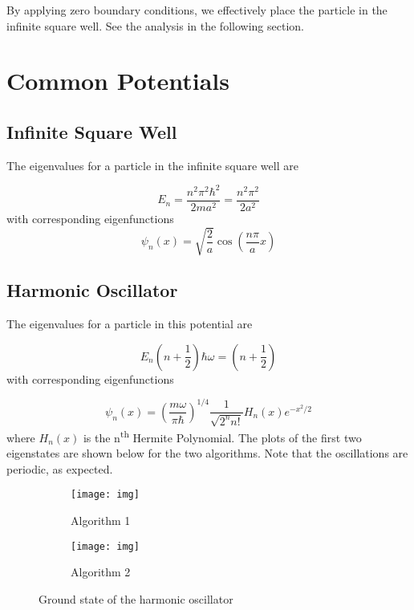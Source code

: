 \documentclass{article}
\begin{document}
By applying zero boundary conditions, we effectively place the particle in the infinite square well. See the analysis in the following section. 

\section{Common Potentials}

\subsection{Infinite Square Well}

The eigenvalues for a particle in the infinite square well are

\begin{equation}
E_n = \frac{n^2 \pi^2 \hbar^2}{2 ma^2} = \frac{n^2 \pi ^2}{2 a^2}
\end{equation}
%
with corresponding eigenfunctions
\begin{equation}
\psi_n(x) = \sqrt{\frac{2}{a}} \cos \left( \frac{n\pi}{a} x \right)
\end{equation}

\subsection{Harmonic Oscillator}

The eigenvalues for a particle in this potential are

\begin{equation}
E_n \left( n + \frac{1}{2} \right) \hbar \omega = \left( n + \frac{1}{2} \right)
\end{equation}
%
with corresponding eigenfunctions

\begin{equation}
\psi_n(x) = \left( \frac{m \omega}{\pi \hbar} \right)^{1/4} \frac{1}{\sqrt{2^n n!}} H_n(x)e^{-x^2/2}
\end{equation}
%
where $H_n(x)$ is the n\textsuperscript{th}  Hermite Polynomial. The plots of the first two eigenstates are shown below for the two algorithms.
Note that the oscillations are periodic, as expected.

\begin{figure}
\centering
\begin{subfigure}[t]{0.3\textwidth}
\centering
\texttt{[image: img]}
\caption{Algorithm 1}
\end{subfigure}
%
\begin{subfigure}[t]{0.3\textwidth}
\centering
\texttt{[image: img]}
\caption{Algorithm 2}
\end{subfigure}

\caption{Ground state of the harmonic oscillator}
\end{figure}
\end{document}
